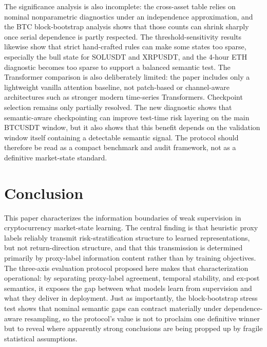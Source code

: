 \documentclass[a4paper,fleqn]{cas-dc}
\begin{document}
The significance analysis is also incomplete: the cross-asset table relies on nominal nonparametric diagnostics under an independence approximation, and the BTC block-bootstrap analysis shows that those counts can shrink sharply once serial dependence is partly respected. The threshold-sensitivity results likewise show that strict hand-crafted rules can make some states too sparse, especially the bull state for SOLUSDT and XRPUSDT, and the 4-hour ETH diagnostic becomes too sparse to support a balanced semantic test. The Transformer comparison is also deliberately limited: the paper includes only a lightweight vanilla attention baseline, not patch-based or channel-aware architectures such as stronger modern time-series Transformers. Checkpoint selection remains only partially resolved. The new diagnostic shows that semantic-aware checkpointing can improve test-time risk layering on the main BTCUSDT window, but it also shows that this benefit depends on the validation window itself containing a detectable semantic signal. The protocol should therefore be read as a compact benchmark and audit framework, not as a definitive market-state standard.

\section{Conclusion}
This paper characterizes the information boundaries of weak supervision in cryptocurrency market-state learning. The central finding is that heuristic proxy labels reliably transmit risk-stratification structure to learned representations, but not return-direction structure, and that this transmission is determined primarily by proxy-label information content rather than by training objectives. The three-axis evaluation protocol proposed here makes that characterization operational: by separating proxy-label agreement, temporal stability, and ex-post semantics, it exposes the gap between what models learn from supervision and what they deliver in deployment. Just as importantly, the block-bootstrap stress test shows that nominal semantic gaps can contract materially under dependence-aware resampling, so the protocol's value is not to proclaim one definitive winner but to reveal where apparently strong conclusions are being propped up by fragile statistical assumptions.
\end{document}
